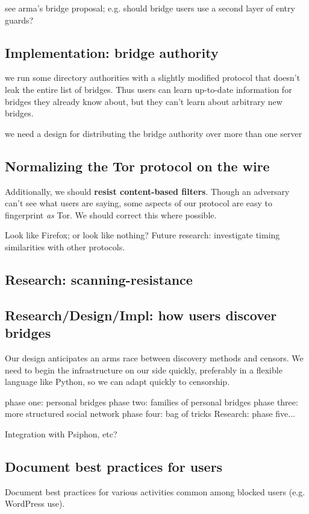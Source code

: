 \documentclass{article}
\begin{document}
see arma's bridge proposal; e.g. should bridge users use a second layer of
entry guards?

\subsection{Implementation: bridge authority}

we run some
directory authorities with a slightly modified protocol that doesn't leak
the entire list of bridges. Thus users can learn up-to-date information
for bridges they already know about, but they can't learn about arbitrary
new bridges.

we need a design for distributing the bridge authority over more than one
server

\subsection{Normalizing the Tor protocol on the wire}
Additionally, we should {\bf resist content-based filters}.  Though an
adversary can't see what users are saying, some aspects of our protocol are
easy to fingerprint {\em as} Tor.  We should correct this where possible.

Look like Firefox; or look like nothing?
Future research: investigate timing similarities with other protocols.

\subsection{Research: scanning-resistance}

\subsection{Research/Design/Impl: how users discover bridges}
Our design anticipates an arms race between discovery methods and censors.
We need to begin the infrastructure on our side quickly, preferably in a
flexible language like Python, so we can adapt quickly to censorship.

phase one: personal bridges
phase two: families of personal bridges
phase three: more structured social network
phase four: bag of tricks
Research: phase five...

Integration with Psiphon, etc?

\subsection{Document best practices for users}
Document best practices for various activities common among
blocked users (e.g. WordPress use).
\end{document}
